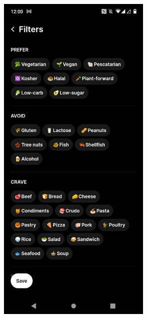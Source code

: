 \documentclass[]{project_final}
\begin{document}
\begin{figure}[ht!]
    \centering
    \begin{minipage}[t]{0.4\textwidth}
        \includegraphics[width=20em]{cremeImage3.png}
    \end{minipage}
    \hfill
    \begin{minipage}[t]{0.4\textwidth}

\end{minipage}
\end{figure}
\end{document}
